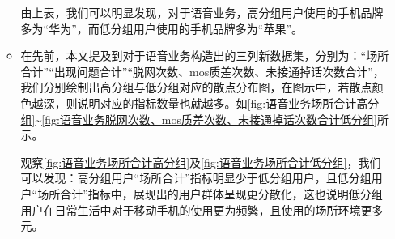 \documentclass{MathorCupmodeling}
\begin{document}
\begin{itemize}
\begin{itemize}
\begin{table}[H]
	\centering
	\caption{语音业务各手机品牌用户占比}
	\label{tab:语音业务各手机品牌用户占比}
\end{table}
			由上表，我们可以明显发现，对于语音业务，高分组用户使用的手机品牌多为“华为”，而低分组用户使用的手机品牌多为“苹果”。
			\item 在先前，本文提及到对于语音业务构造出的三列新数据集，分别为：“场所合计”“出现问题合计”“脱网次数、mos质差次数、未接通掉话次数合计”，我们分别绘制出高分组与低分组对应的散点分布图，在图示中，若散点颜色越深，则说明对应的指标数量也就越多。如\textcolor{blue}{\cref{fig:语音业务场所合计高分组}}\textasciitilde\textcolor{blue}{\cref{fig:语音业务脱网次数、mos质差次数、未接通掉话次数合计低分组}}所示。
			
			观察\textcolor{blue}{\cref{fig:语音业务场所合计高分组}}及\textcolor{blue}{\cref{fig:语音业务场所合计低分组}}，我们可以发现：高分组用户“场所合计”指标明显少于低分组用户，且低分组用户“场所合计”指标中，展现出的用户群体呈现更分散化，这也说明低分组用户在日常生活中对于移动手机的使用更为频繁，且使用的场所环境更多元。


\end{itemize}
\end{itemize}
\end{document}
